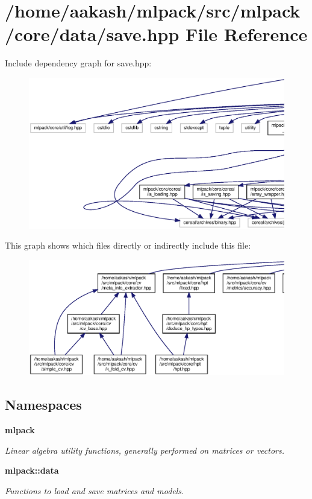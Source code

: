 \section{/home/aakash/mlpack/src/mlpack/core/data/save.hpp File Reference}
\label{save_8hpp}
Include dependency graph for save.\+hpp\+:
\nopagebreak
\begin{figure}[H]
\begin{center}
\leavevmode
\includegraphics[width=350pt]{save_8hpp__incl}
\end{center}
\end{figure}
This graph shows which files directly or indirectly include this file\+:
\nopagebreak
\begin{figure}[H]
\begin{center}
\leavevmode
\includegraphics[width=350pt]{save_8hpp__dep__incl}
\end{center}
\end{figure}
\subsection*{Namespaces}
\begin{DoxyCompactItemize}
\item 
 \textbf{ mlpack}
\begin{DoxyCompactList}\small\item\em Linear algebra utility functions, generally performed on matrices or vectors. \end{DoxyCompactList}\item 
 \textbf{ mlpack\+::data}
\begin{DoxyCompactList}\small\item\em Functions to load and save matrices and models. \end{DoxyCompactList}\end{DoxyCompactItemize}
